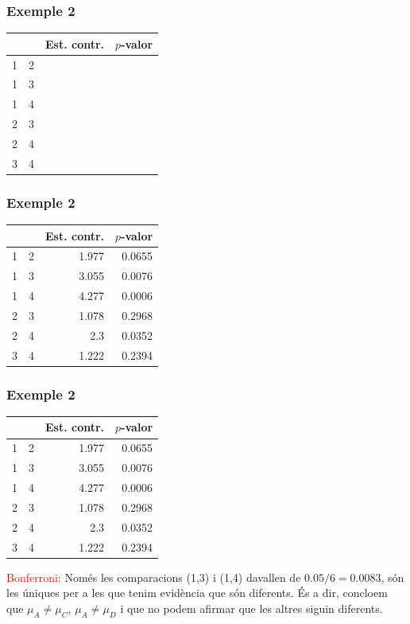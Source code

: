 \documentclass[12pt,t]{beamer}
\newcommand{\red}[1]{\textcolor{red}{#1}}
\theoremstyle{plain}
\theoremstyle{definition}
\begin{document}
\begin{frame} 
\frametitle{Exemple 2}
\vspace*{-3ex}

\begin{center}
\begin{tabular}{r|r|r|r|}
& & Est. contr. & $p$-valor\\
\hline
1 & 2 & & \\
1 & 3 & & \\
1 & 4 & & \\
2 & 3 & & \\
2 &4 & & \\
3 & 4 & & \\
\end{tabular}
\end{center}

\end{frame}


\begin{frame} 
\frametitle{Exemple 2}
\vspace*{-3ex}


\begin{center}
\begin{tabular}{r|r|r|r|}
& & Est. contr. & $p$-valor\\
\hline
1 & 2 & 1.977 & 0.0655  \\
1 & 3 & 3.055 & 0.0076 \\
1 & 4 & 4.277 & 0.0006 \\
2 & 3 & 1.078 & 0.2968 \\
2 &4 & 2.3 & 0.0352 \\
3 & 4 & 1.222 & 0.2394 \\
\end{tabular}
\end{center}

\end{frame}

\begin{frame} 
\frametitle{Exemple 2}
\vspace*{-3ex}


\begin{center}
\begin{tabular}{r|r|r|r|}
& & Est. contr. & $p$-valor\\
\hline
1 & 2 & 1.977 & 0.0655  \\
1 & 3 & 3.055 & 0.0076 \\
1 & 4 & 4.277 & 0.0006 \\
2 & 3 & 1.078 & 0.2968 \\
2 &4 & 2.3 & 0.0352 \\
3 & 4 & 1.222 & 0.2394 \\
\end{tabular}
\end{center}

\red{Bonferroni}: Només les comparacions (1,3) i (1,4) davallen de $0.05/6=0.0083$, són les úniques per a les que tenim evidència que són diferents. És a dir, concloem que $\mu_A\neq \mu_C$, $\mu_A\neq \mu_D$ i que no podem afirmar que les altres siguin diferents.

\end{frame}
\end{document}
